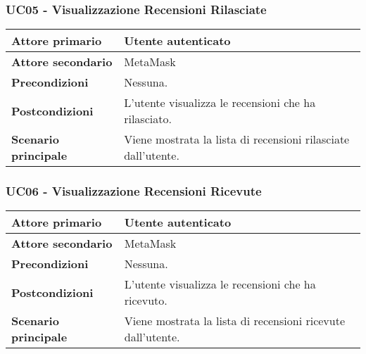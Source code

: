 \subsubsection{UC05 - Visualizzazione Recensioni Rilasciate}
\label{UC05}
\begin{center}
\renewcommand{\arraystretch}{1.5}
\begin{tabular}{ | m{10em} | m{20em} | }
    \hline
    \textbf{Attore primario} & Utente autenticato \\
    \hline
    \textbf{Attore secondario} & MetaMask \\
    \hline
    \textbf{Precondizioni} & Nessuna. \\
    \hline
    \textbf{Postcondizioni} & L'utente visualizza le recensioni che ha rilasciato. \\
    \hline
    \textbf{Scenario principale} & Viene mostrata la lista di recensioni rilasciate dall'utente. \\
    \hline
   \end{tabular}
\end{center}

\subsubsection{UC06 - Visualizzazione Recensioni Ricevute}
\label{UC06}
\begin{center}
\renewcommand{\arraystretch}{1.5}
\begin{tabular}{ | m{10em} | m{20em} | }
    \hline
    \textbf{Attore primario} & Utente autenticato \\
    \hline
    \textbf{Attore secondario} & MetaMask \\
    \hline
    \textbf{Precondizioni} & Nessuna. \\
    \hline
    \textbf{Postcondizioni} & L'utente visualizza le recensioni che ha ricevuto. \\
    \hline
    \textbf{Scenario principale} & Viene mostrata la lista di recensioni ricevute dall'utente. \\
    \hline
   \end{tabular}
\end{center}

